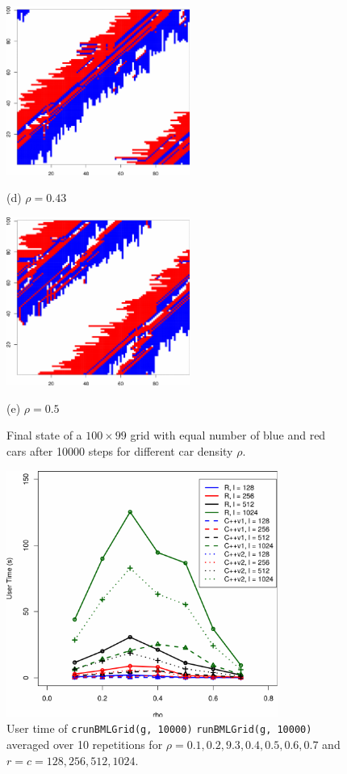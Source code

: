\documentclass{article}
\begin{document}
\begin{figure}[H]
    \hfill
    \begin{minipage}[b]{0.5\linewidth}
      \centering
      \centerline{\includegraphics[width=6.0cm]{./figs/TestBehavior_100_99_10000_043_end}}
      \centerline{(d) $\rho = 0.43$}\medskip
    \end{minipage}
    \hfill
    \begin{minipage}[b]{1\linewidth}
      \centering
      \centerline{\includegraphics[width=6.0cm]{./figs/TestBehavior_100_99_10000_05_end}}
      \centerline{(e) $\rho = 0.5$}\medskip
    \end{minipage}
    \caption{Final state of a $100\times99$ grid with equal number of blue and
    red cars after 10000 steps for different car density $\rho$.}
    \label{fig:final_state}
\end{figure}

\begin{figure}[H]
    \centering
    \includegraphics[width=3.5in]{figs/TestRunningTime.pdf}
    \caption{User time of \texttt{crunBMLGrid(g, 10000)} \texttt{runBMLGrid(g,
    10000)} averaged over 10 repetitions for $\rho=0.1,0.2,9.3,0.4,0.5,0.6,0.7$
    and $r=c=128,256,512,1024$.}
    \label{fig:running_time}
\end{figure}
\end{document}
